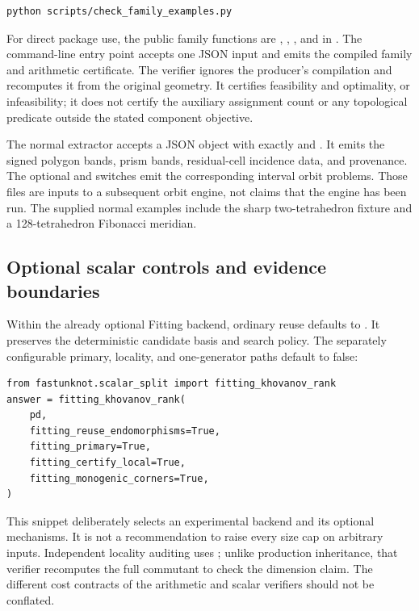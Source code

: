 \begin{lstlisting}
python scripts/check_family_examples.py
\end{lstlisting}

For direct package use, the public family functions are
, ,
, and  in
. The command-line entry point accepts
one JSON input and emits the compiled family and arithmetic certificate.
The verifier ignores the producer's compilation and recomputes it from the
original geometry. It certifies feasibility and optimality, or infeasibility;
it does not certify the auxiliary assignment count or any topological
predicate outside the stated component objective.

The normal extractor accepts a JSON object with exactly
 and . It emits the signed polygon
bands, prism bands, residual-cell incidence data, and provenance.
The optional  and
 switches emit the corresponding interval
orbit problems. Those files are inputs to a subsequent orbit engine, not
claims that the engine has been run. The supplied normal examples include
the sharp two-tetrahedron fixture and a 128-tetrahedron Fibonacci meridian.

\subsection{Optional scalar controls and evidence boundaries}

Within the already optional Fitting backend, ordinary reuse defaults to
. It preserves the deterministic
candidate basis and search policy. The separately configurable primary,
locality, and one-generator paths default to false:

\begin{lstlisting}
from fastunknot.scalar_split import fitting_khovanov_rank
answer = fitting_khovanov_rank(
    pd,
    fitting_reuse_endomorphisms=True,
    fitting_primary=True,
    fitting_certify_local=True,
    fitting_monogenic_corners=True,
)
\end{lstlisting}

This snippet deliberately selects an experimental backend and its optional
mechanisms. It is not a recommendation to raise every size cap on arbitrary
inputs. Independent locality auditing uses
; unlike production inheritance,
that verifier recomputes the full commutant to check the dimension claim.
The different cost contracts of the arithmetic and scalar verifiers should
not be conflated.

